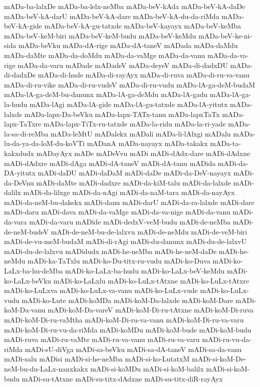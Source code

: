 {mADa-ba-lalxDe
mADa-ba-lelx-neMba
mADa-beV-kAda
mADa-beV-kA-daDe
mADa-beV-kA-darU
mADa-beV-kA-dare
mADa-beV-kA-du-da-riMda
mADa-beV-kA-gide
mADa-beV-kA-gu-tatxde
mADa-beV-kayayx
mADa-beV-keMba
mADa-beV-keM-biri
mADa-beV-keM-budu
mADa-beV-keMdu
mADa-beV-ke-ni-sida
mADa-beVku
mADa-dA-rige
mADa-dA-taneV
mADada
mADa-daMdu
mADa-daMte
mADa-da-doMdu
mADa-da-vaMge
mADa-da-vanu
mADa-da-va-rige
mADa-da-varu
mADade
mADadeV
mADa-deyeV
mADa-di-dadxDU
mADa-di-dadxDe
mADa-di-hude
mADa-di-rayAyx
mADa-di-ruva
mADa-di-ru-va-vanu
mADa-di-ru-vike
mADa-di-ru-vudeV
mADa-di-ru-vudu
mADa-lA-ga-deM-budaM
mADa-lA-ga-deM-bu-danunx
mADa-lA-ga-deMdu
mADa-lA-gadu
mADa-lA-ga-la-hudu
mADa-lAgi
mADa-lA-gide
mADa-lA-gu-tatxde
mADa-lA-yitutx
mADa-lalxde
mADa-lapx-Da-beVku
mADa-lapx-TATx-tanu
mADa-lapxTaTx
mADa-lapx-TaTxre
mADa-lapx-TiTx-ru-tatxde
mADa-la-ridu
mADa-la-ri-yade
mADa-la-sa-di-reMba
mADa-leMtU
mADalekx
mADali
mADa-li-lAlxgi
mADalu
mADa-lu-da-ya-da-loM-du-koVTi
mADanA
mADa-nayayx
mADa-takakx
mADa-ta-kakxdudx
mADayAyx
mADe
mADeVvu
mADi
mADi-dAdx-dare
mADi-dAdxne
mADi-dAdxre
mADi-dAga
mADi-dA-taneV
mADi-dA-tanu
mADida
mADi-da-DA-yitutx
mADi-daDU
mADi-daDaM
mADi-daDe
mADi-da-DeV-nayayx
mADi-da-DeVnu
mADi-daMte
mADi-dadxre
mADi-da-kiM-talu
mADi-da-lalxde
mADi-dalilx
mADi-da-lilxge
mADi-da-nAgi
mADi-da-naM-tara
mADi-da-nayAyx
mADi-da-neM-bu-dakekx
mADi-danu
mADi-darU
mADi-da-ra-lalxde
mADi-dare
mADi-daru
mADi-dava
mADi-da-vaMge
mADi-da-va-nige
mADi-da-vanu
mADi-da-vara
mADi-da-varu
mADide
mADi-dedxV-veM-budu
mADi-de-neMba
mADi-de-neM-budeV
mADi-de-neM-bu-de-lalxvu
mADi-de-neMdu
mADi-de-veM-biri
mADi-de-vu-meM-budaM
mADi-di-rAgi
mADi-du-danunx
mADi-du-de-lalxvU
mADi-du-de-lalxvu
mADidudx
mADi-he-neMba
mADi-he-neM-daDe
mADi-he-neMdu
mADi-ka-TaTxlu
mADi-ko-Du-titx-ru-vudu
mADi-ko-Duva
mADi-ko-LaLx-ba-hu-deMba
mADi-ko-LaLx-ba-hudu
mADi-ko-LaLx-beV-keMdu
mADi-ko-LaLx-beVku
mADi-ko-LaLxlu
mADi-ko-LuLx-tAtxne
mADi-ko-LuLx-tAtxre
mADi-ko-LuLxva
mADi-ko-LuLx-va-vanu
mADi-ko-LuLx-vude
mADi-ko-LuLx-vudu
mADi-ko-Lute
mADi-koMDa
mADi-koM-Da-lalxde
mADi-koM-Dare
mADi-koM-Da-vanu
mADi-koM-Da-vareV
mADi-koM-Di-ru-tAtxne
mADi-koM-Di-ruva
mADi-koM-Di-ru-vaMtha
mADi-koM-Di-ru-va-vanu
mADi-koM-Di-ru-va-varu
mADi-koM-Di-ru-vu-da-riMda
mADi-koMDu
mADi-koM-bude
mADi-koM-budu
mADi-ruva
mADi-ru-vaMte
mADi-ru-va-vanu
mADi-ru-va-varu
mADi-ru-vu-da-riMda
mADi-sU-diVga
mADi-sa-beVku
mADi-sa-dA-taneV
mADi-sa-da-vanu
mADi-salu
mADisi
mADi-si-he-neMba
mADi-si-ko-LutatxM
mADi-si-koM-De-neM-bu-du-LaLx-nanxkakx
mADi-si-koMDu
mADi-si-koM-balilx
mADi-si-koM-budu
mADi-su-tAtxne
mADi-su-titx-dAdxne
mADi-su-titx-diR-rayAyx
}
